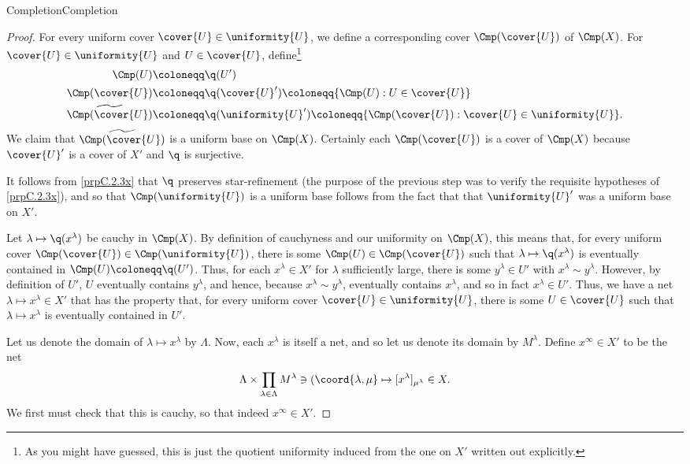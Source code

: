 \begin{thm}{Completion}{Completion}
\begin{proof}
For every uniform cover $\cover{U}\in \uniformity{U}$, we define a corresponding cover $\Cmp (\cover{U})$ of $\Cmp (X)$.  For $\cover{U}\in \uniformity{U}$ and $U\in \cover{U}$, define\footnote{As you might have guessed, this is just the quotient uniformity induced from the one on $X'$ written out explicitly.}
\begin{equation}
\begin{split}
\Cmp (U) & \coloneqq \q (U') \\
\Cmp (\cover{U}) & \coloneqq \q (\cover{U}')\coloneqq \{ \Cmp (U):U\in \cover{U}\} \\
\widetilde{\Cmp (\cover{U})} & \coloneqq \q (\uniformity{U}') \coloneqq \{ \Cmp (\cover{U}):\cover{U}\in \uniformity{U}\} .
\end{split}
\end{equation}
We claim that $\widetilde{\Cmp (\cover{U})}$ is a uniform base on $\Cmp (X)$.  Certainly each $\Cmp (\cover{U})$ is a cover of $\Cmp (X)$ because $\cover{U}'$ is a cover of $X'$ and $\q$ is surjective.

It follows from \cref{prpC.2.3x} that $\q$ preserves star-refinement (the purpose of the previous step was to verify the requisite hypotheses of \cref{prpC.2.3x}), and so that $\Cmp (\uniformity{U})$ is a uniform base follows from the fact that that $\uniformity{U}'$ was a uniform base on $X'$.

Let $\lambda \mapsto \q (x^\lambda )$ be cauchy in $\Cmp (X)$.  By definition of cauchyness and our uniformity on $\Cmp (X)$, this means that, for every uniform cover $\Cmp (\cover{U})\in \Cmp (\uniformity{U})$, there is some $\Cmp (U)\in \Cmp (\cover{U})$ such that $\lambda \mapsto \q (x^\lambda )$ is eventually contained in $\Cmp (U)\coloneqq \q (U')$.  Thus, for each $x^\lambda \in X'$ for $\lambda$ sufficiently large, there is some $y^\lambda \in U'$ with $x^\lambda \sim y^\lambda$.  However, by definition of $U'$, $U$ eventually contains $y^\lambda$, and hence, because $x^\lambda \sim y^\lambda$, eventually contains $x^\lambda$, and so in fact $x^\lambda \in U'$.  Thus, we have a net $\lambda \mapsto x^\lambda \in X'$ that has the property that, for every uniform cover $\cover{U}\in \uniformity{U}$, there is some $U\in \cover{U}$ such that $\lambda \mapsto x^\lambda$ is eventually contained in $U'$.

Let us denote the domain of $\lambda \mapsto x^\lambda$ by $\Lambda$.  Now, each $x^\lambda$ is itself a net, and so let us denote its domain by $M^\lambda$.  Define $x^\infty \in X'$ to be the net
\begin{equation}
\Lambda \times \prod _{\lambda \in \Lambda}M^\lambda \ni (\coord{\lambda ,\mu }\mapsto [x^\lambda ]_{\mu ^\lambda}\in X.
\end{equation}
We first must check that this is cauchy, so that indeed $x^\infty \in X'$.


\end{proof}
\end{thm}
